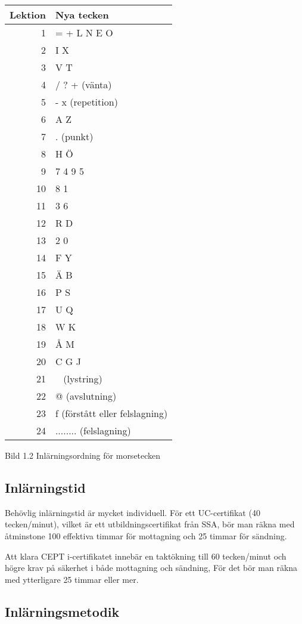 \documentclass[a4paper,twoside,twocolumn,openright]{book}
\begin{document}
\begin{center}
\begin{tabular}{|r|l|}
\hline
Lektion & Nya tecken \\ \hline
1 & = + L N E O \\
2 & I X \\
3 & V T \\
4 & / ? + (vänta) \\
5 & - x (repetition) \\
6 & A Z \\
7 & . (punkt) \\
8 & H Ö \\
9 & 7 4 9 5 \\
10 & 8 1 \\
11 & 3 6 \\
12 & R D \\
13 & 2 0 \\
14 & F Y \\
15 & Ä B \\
16 & P S \\
17 & U Q \\
18 & W K \\
19 & Å M \\
20 & C G J \\
21 & ~ (lystring) \\
22 & @ (avslutning) \\
23 & f (förstått eller felslagning) \\
24 & ........ (felslagning) \\
\hline
\end{tabular}
\end{center}

Bild 1.2 Inlärningsordning för morsetecken

\subsection{Inlärningstid}

Behövlig inlärningstid är mycket individuell. För ett UC-certifikat (40 tecken/minut),
vilket är ett utbildningscertifikat från SSA, bör man räkna med åtminstone 100 effektiva
timmar för mottagning och 25 timmar för sändning.

Att klara CEPT i-certifikatet innebär en taktökning till 60 tecken/minut och högre
krav på säkerhet i både mottagning och sändning, För det bör man räkna med ytterligare
25 timmar eller mer.

\subsection{Inlärningsmetodik}
\end{document}
